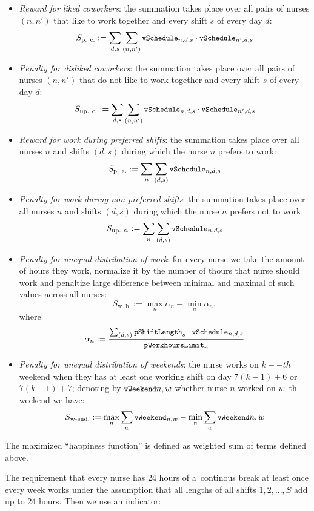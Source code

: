 \begin{itemize}
    \item \textit{Reward for liked coworkers}: the summation takes place over all pairs of nurses $(n, n')$ that like to work together and every shift $s$ of every day $d$:
    \[ S_\text{p. c.} := \sum_{d,s} \sum_{(n, n')} \texttt{\small vSchedule}_{n,d,s} \cdot \texttt{\small vSchedule}_{n',d,s} \]
    \item \textit{Penalty for disliked coworkers}: the summation takes place over all pairs of nurses $(n, n')$ that do not like to work together and every shift $s$ of every day $d$:
    \[ S_\text{up. c.} := \sum_{d,s} \sum_{(n, n')} \texttt{\small vSchedule}_{n,d,s} \cdot \texttt{\small vSchedule}_{n',d,s} \]
    \item \textit{Reward for work during preferred shifts}: the summation takes place over all nurses $n$ and shifts $(d, s)$ during which the nurse $n$ prefers to work:
    \[ S_\text{p. s.} := \sum_{n} \sum_{(d, s)} \texttt{\small vSchedule}_{n,d,s} \]
    \item \textit{Penalty for work during non preferred shifts}: the summation takes place over all nurses $n$ and shifts $(d, s)$ during which the nurse $n$ prefers not to work:
    \[ S_\text{up. s.} := \sum_{n} \sum_{(d, s)} \texttt{\small vSchedule}_{n,d,s} \]
    \item \textit{Penalty for unequal distribution of work}: for every nurse we take the amount of hours they work, normalize it by the number of thours that nurse should work and penaltize large difference between minimal and maximal of such values across all nurses:
    \[ S_\text{w. h.} := \max_{n} \alpha_n - \min_n \alpha_n, \]
    where 
    \[ \alpha_n := \frac{\sum_{(d, s)} \texttt{\small pShiftLength}_s \cdot \texttt{\small vSchedule}_{n, d, s}}{\texttt{\small pWorkhoursLimit}_n} \]
    \item \textit{Penalty for unequal distribution of weekends}: the nurse works on $k--th$ weekend when they has at least one working shift on day $7(k-1) + 6$ or $7(k-1) + 7$; denoting by $\texttt{\small vWeekend}{n, w}$ whether nurse $n$ worked on $w$--th weekend we have:
    \[ S_\text{w-end.} := \max_n \sum_w \texttt{\small vWeekend}_{n, w} - \min_n \sum_w \texttt{\small vWeekend}{n, w} \]
\end{itemize}

The maximized ``happiness function'' is defined as weighted sum of terms defined above.

The requirement that every nurse has 24 hours of a~continous break at least once every week works under the assumption that all lengths of all shifts $1, 2, ..., S$ add up to 24 hours. Then we use an indicator:

